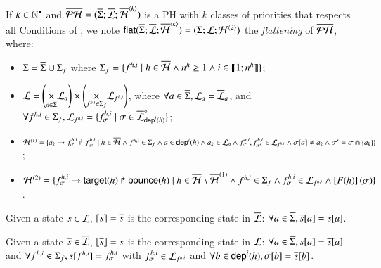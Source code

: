 \begin{definition}
  \label{def:flattening}
  If $k \in \mathbb{N}^\bullet$ and $\overline{\mathcal{PH}} = (\overline{\Sigma}; \overline{\mathcal{L}}; \overline{\mathcal{H}}^{{\langle k \rangle}})$
  is a PH with $k$ classes of priorities that respects all Conditions of ,
  we note $\mathsf{flat}(\overline{\Sigma}; \overline{\mathcal{L}}; \overline{\mathcal{H}}^{{\langle k \rangle}}) = (\Sigma; \mathcal{L}; \mathcal{H}^{{\langle 2 \rangle}})$
  the \emph{flattening} of $\overline{\mathcal{PH}}$, where:
  \begin{itemize}
    \item $\Sigma = \overline{\Sigma} \cup \Sigma_f$
      where $\Sigma_f = \{ f^{h,i} \mid h \in \overline{\mathcal{H}} \wedge n^{h} \geq 1 \wedge i \in \llbracket 1; n^{h} \rrbracket \}$;
    \item $\mathcal{L} = \left( \underset{a \in \overline{\Sigma}}{\times} \mathcal{L}_{a} \right) \times
      \left(\underset{f^{h,i} \in \Sigma_f}{\times} \mathcal{L}_{f^{h,i}} \right)$,
      where $\forall a \in \overline{\Sigma}, \mathcal{L}_{a} = \overline{\mathcal{L}}_{a}$, and
      $\forall f^{h,i} \in \Sigma_f,
      \mathcal{L}_{f^{h,i}} = \{ f^{h,i}_\sigma \mid \sigma \in \overline{\mathcal{L}}^\diamond_{\mathsf{dep}^{i}(h)} \}$;
    \item $\mathcal{H}^{(1)} = \{ a_k\rightarrow f^{h,i}_\sigma\Rsh f^{h,i}_{\sigma'} \mid
      h \in \overline{\mathcal{H}} \wedge
      f^{h,i} \in \Sigma_f \wedge
      a \in \mathsf{dep}^{i}(h) \wedge a_k \in \mathcal{L}_a \wedge
      f^{h,i}_\sigma , f^{h,i}_{\sigma'} \in \mathcal{L}_{f^{h,i}} \wedge
      {\sigma[a]} \neq a_k \wedge \sigma' = \sigma \Cap \{ a_k \} \}$;
    \item $\mathcal{H}^{(2)}=\{ f^{h,i}_\sigma\rightarrow\mathsf{target}(h)\Rsh\mathsf{bounce}(h) \mid
      h \in \overline{\mathcal{H}} \setminus \overline{\mathcal{H}}^{(1)} \wedge
      f^{h,i} \in \Sigma_f \wedge
      f^{h,i}_\sigma \in \mathcal{L}_{f^{h,i}} \wedge \left[F(h)\right](\sigma) \}$.
  \end{itemize}
  Given a state $s \in \mathcal{L}$, $\lceil s \rceil = \overline{s}$ is the corresponding state in $\overline{\mathcal{L}}$:
  $\forall a \in \overline{\Sigma}, {\overline{s}[a]} = {s[a]}$.

  \noindent
  Given a state $\overline{s} \in \overline{\mathcal{L}}$, $\lfloor \overline{s} \rfloor = s$ is the corresponding state in $\mathcal{L}$:
  $\forall a \in \overline{\Sigma}, {s[a]} = {\overline{s}[a]}$
  and $\forall f^{h,i} \in \Sigma_f, {s[f^{h,i}]} = f^{h,i}_\sigma$ with $f^{h,i}_\sigma \in \mathcal{L}_{f^{h,i}}$
  and $\forall b \in \mathsf{dep}^{i}(h), {\sigma[b]} = {\overline{s}[b]}$.
\end{definition}

